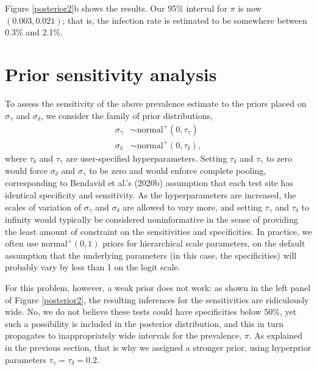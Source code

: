 \documentclass[11pt]{article}
\begin{document}
Figure \ref{posterior2}b shows the results.  Our 95\% interval for $\pi$ is now $(0.003, 0.021)$; that is, the infection rate is estimated to be somewhere between 0.3\% and 2.1\%.

\section{Prior sensitivity analysis}

To assess the sensitivity of the above prevalence estimate to the priors
placed on $\sigma_{\gamma}$ and $\sigma_{\delta}$, we consider the family of prior distributions,
\begin{align*}
  \sigma_{\gamma} & \sim \mbox{normal}^+(0, \tau_{\gamma})\\
\sigma_{\delta} & \sim  \mbox{normal}^+(0, \tau_{\delta}),
\end{align*}
where $\tau_{\delta} $ and $\tau_{\gamma} $ are user-specified
hyperparameters. Setting  $\tau_{\delta}$ and
$\tau_{\gamma}$ to zero would force $\sigma_{\delta}$ and
$\sigma_{\gamma}$ to be zero and would enforce complete pooling,
corresponding to Bendavid et al.'s (2020b) assumption that each test site has identical
specificity  and sensitivity. As the hyperparameters are increased, the
scales of variation of $\sigma_{\gamma}$ and $\sigma_{\delta}$ are
allowed to vary more, and setting $\tau_{\gamma}$ and $\tau_{\delta}$ to infinity would typically be considered noninformative in the sense of providing the least amount of constraint on the sensitivities and specificities.  In practice, we often use $\mbox{normal}^+(0,1)$ priors for hierarchical scale parameters, on the default assumption that the underlying parameters (in this case, the specificities) will probably vary by less than 1 on the logit scale.

For this problem, however, a weak prior does not work:  as shown in the left panel of Figure \ref{posterior2}, the resulting inferences for the sensitivities are ridiculously wide. No, we do not believe these tests could have specificities below 50\%, yet such a possibility is included in the posterior distribution, and this in turn propagates to inappropriately wide intervals for the prevalence, $\pi$.  As explained in the previous section, that is why we assigned a stronger prior, using hyperprior parameters $\tau_{\gamma}=\tau_{\delta}=0.2$.
\end{document}
